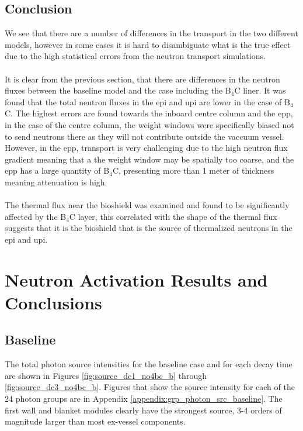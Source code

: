 \documentclass[12pt]{article}
\begin{document}
\subsection{Conclusion}
We see that there are a number of differences in the transport in the two different models,
however in some cases it is hard to disambiguate what is the true effect due to the high 
statistical errors from the neutron transport simulations. 
\\
\\
It is clear from the previous section, that there are differences in the neutron fluxes 
between the baseline model and the case including the B$_4$C liner. It was found that 
the total neutron fluxes in the \gls{epi} and \gls{upi} are lower in the case of B$_4$C.
The highest errors are found towards the inboard centre column and the \gls{epp}, 
in the case of the centre column, the weight windows were specifically biased not to send
neutrons there as they will not contribute outside the vaccuum vessel. However, in the 
\gls{epp}, transport is very challenging due to the high neutron flux gradient meaning that
a the weight window may be spatially too coarse, and the \gls{epp} has a large quantity of
B$_4$C, presenting more than 1 meter of thickness meaning attenuation is high. 
\\
\\
The thermal flux near the bioshield was examined and found to be significantly affected
by the B$_4$C layer, this correlated with the shape of the thermal flux suggests that 
it is the bioshield that is the source of thermalized neutrons in the \gls{epi} and \gls{upi}.

\newpage
\clearpage

\section{Neutron Activation Results and Conclusions}

\subsection{Baseline}

The total photon source intensities for the baseline case and for each decay
time are shown in Figures \ref{fig:source_dc1_no4bc_b}
through \ref{fig:source_dc3_no4bc_b}.  Figures that show the source intensity
for each of the 24 photon groups are in
Appendix \ref{appendix:grp_photon_src_baseline}.  The first wall and blanket modules
clearly have the strongest source, 3-4 orders of magnitude larger than most
ex-vessel components.
\end{document}
